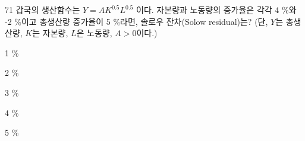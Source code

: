 \begin{question}{71}
갑국의 생산함수는 $Y=AK^{0.5}L^{0.5}$ 이다. 자본량과 노동량의 증가율은 각각 4 \%와 -2 \%이고 총생산량 증가율이 5 \%라면, 솔로우 잔차(Solow residual)는? (단, $Y$는 총생산량, $K$는 자본량, $L$은 노동량, $A>0$이다.)
\begin{choices}
  \item 1 \%
  \item 2 \%
  \item 3 \%
  \item 4 \%
  \item 5 \%
\end{choices}
\end{question}
